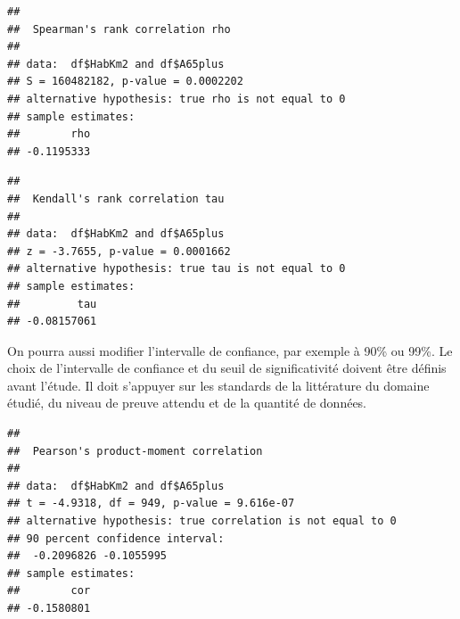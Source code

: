 \documentclass[
  11pt,
  french,
]{book}
\makeatletter
\newenvironment{Shaded}{\begin{snugshade}}{\end{snugshade}}
\newcommand{\CommentTok}[1]{\textcolor[rgb]{0.56,0.35,0.01}{\textit{#1}}}
\newcommand{\DataTypeTok}[1]{\textcolor[rgb]{0.13,0.29,0.53}{#1}}
\newcommand{\FloatTok}[1]{\textcolor[rgb]{0.00,0.00,0.81}{#1}}
\newcommand{\KeywordTok}[1]{\textcolor[rgb]{0.13,0.29,0.53}{\textbf{#1}}}
\newcommand{\NormalTok}[1]{#1}
\newcommand{\OperatorTok}[1]{\textcolor[rgb]{0.81,0.36,0.00}{\textbf{#1}}}
\newcommand{\StringTok}[1]{\textcolor[rgb]{0.31,0.60,0.02}{#1}}
\newenvironment{kframe}{%
\medskip{}
\setlength{\fboxsep}{.8em}
 \def\at@end@of@kframe{}%
 \ifinner\ifhmode%
  \def\at@end@of@kframe{\end{minipage}}%
  \begin{minipage}{\columnwidth}%
 \fi\fi%
 \def\FrameCommand##1{\hskip\@totalleftmargin \hskip-\fboxsep
 \colorbox{shadecolor}{##1}\hskip-\fboxsep
     \hskip-\linewidth \hskip-\@totalleftmargin \hskip\columnwidth}%
 \MakeFramed {\advance\hsize-\width
   \@totalleftmargin\z@ \linewidth\hsize
   \@setminipage}}%
 {\par\unskip\endMakeFramed%
 \at@end@of@kframe}
\renewenvironment{Shaded}{\begin{kframe}}{\end{kframe}}
\makeatother
\begin{document}
\begin{Shaded}
\end{Shaded}

\begin{verbatim}
## 
## 	Spearman's rank correlation rho
## 
## data:  df$HabKm2 and df$A65plus
## S = 160482182, p-value = 0.0002202
## alternative hypothesis: true rho is not equal to 0
## sample estimates:
##        rho 
## -0.1195333
\end{verbatim}

\begin{Shaded}
\end{Shaded}

\begin{verbatim}
## 
## 	Kendall's rank correlation tau
## 
## data:  df$HabKm2 and df$A65plus
## z = -3.7655, p-value = 0.0001662
## alternative hypothesis: true tau is not equal to 0
## sample estimates:
##         tau 
## -0.08157061
\end{verbatim}

On pourra aussi modifier l'intervalle de confiance, par exemple à 90\% ou 99\%. Le choix de l'intervalle de confiance et du seuil de significativité doivent être définis avant l'étude. Il doit s'appuyer sur les standards de la littérature du domaine étudié, du niveau de preuve attendu et de la quantité de données.

\begin{Shaded}
\end{Shaded}

\begin{verbatim}
## 
## 	Pearson's product-moment correlation
## 
## data:  df$HabKm2 and df$A65plus
## t = -4.9318, df = 949, p-value = 9.616e-07
## alternative hypothesis: true correlation is not equal to 0
## 90 percent confidence interval:
##  -0.2096826 -0.1055995
## sample estimates:
##        cor 
## -0.1580801
\end{verbatim}
\end{document}

